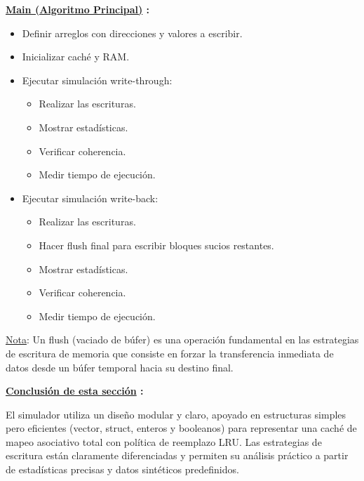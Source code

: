 \documentclass{article}
\begin{document}
\quad

\textbf{ \underline{Main (Algoritmo Principal)} :}
    
\quad

\begin{itemize}
    \item Definir arreglos con direcciones y valores a escribir.
    \item Inicializar caché y RAM.
    \item Ejecutar simulación write-through:

    \begin{itemize}
        \item Realizar las escrituras.
        \item Mostrar estadísticas.
        \item Verificar coherencia.
        \item Medir tiempo de ejecución.
    \end{itemize}

    \item Ejecutar simulación write-back:

    \begin{itemize}
        \item Realizar las escrituras.
        \item Hacer flush final para escribir bloques sucios restantes.
        \item Mostrar estadísticas.
        \item Verificar coherencia.
        \item Medir tiempo de ejecución.
    \end{itemize}
    
\end{itemize} 

{\underline{Nota}: Un flush (vaciado de búfer) es una operación fundamental en las estrategias de escritura de memoria que consiste en forzar la transferencia inmediata de datos desde un búfer temporal hacia su destino final.}

\quad

\textbf{ \underline{Conclusión de esta sección} :}

\quad

{El simulador utiliza un diseño modular y claro, apoyado en estructuras simples pero eficientes (vector, struct, enteros y booleanos) para representar una caché de mapeo asociativo total con política de reemplazo LRU. Las estrategias de escritura están claramente diferenciadas y permiten su análisis práctico a partir de estadísticas precisas y datos sintéticos predefinidos.}
\end{document}

